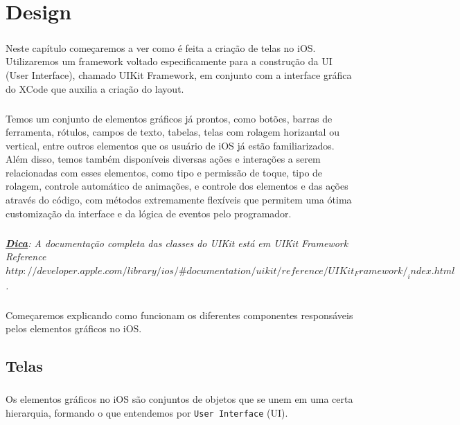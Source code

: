 \documentclass[a4paper,12pt,brazil,doubleside]{book}
\begin{document}
\chapter{Design}

\paragraph{}Neste capítulo começaremos a ver como é feita a criação de telas no iOS. Utilizaremos um framework voltado especificamente para a construção da UI (User Interface), chamado UIKit Framework, em conjunto com a interface gráfica do XCode que auxilia a criação do layout.
\paragraph{}Temos um conjunto de elementos gráficos já prontos, como botões, barras de ferramenta, rótulos, campos de texto, tabelas, telas com rolagem horizantal ou vertical, entre outros elementos que os usuário de iOS já estão familiarizados. Além disso, temos também disponíveis diversas ações e interações a serem relacionadas com esses elementos, como tipo e permissão de toque, tipo de rolagem, controle automático de animações, e controle dos elementos e das ações através do código, com métodos extremamente flexíveis que permitem uma ótima customização da interface e da lógica de eventos pelo programador.

\paragraph{}\textit{\textbf{\underline{Dica}}: A documentação completa das classes do UIKit está em 
UIKit Framework Reference\\ \(http://developer.apple.com/library/ios/\#documentation/uikit/reference/UIKit_Framework/_index.html\).}

\paragraph{}Começaremos explicando como funcionam os diferentes componentes responsáveis pelos elementos gráficos no iOS.

\bigskip
\bigskip


\section{Telas}

\paragraph{}Os elementos gráficos no iOS são conjuntos de objetos que se unem em uma certa hierarquia, formando o que entendemos por \texttt{User Interface} (UI).
\end{document}
